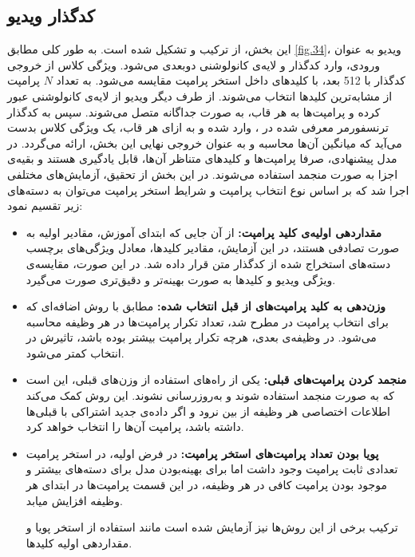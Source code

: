 \subsection{کدگذار ویدیو}
این بخش، از ترکیب  و  تشکیل شده است. به طور کلی مطابق \cref{fig.34}، ویدیو به عنوان ورودی، وارد کدگذار  و لایه‌ی کانولوشنی دو‌بعدی می‌شود. ویژگی کلاس  از خروجی کدگذار  با 512 بعد، با کلیدهای داخل استخر پرامپت مقایسه می‌شود. به تعداد $N$ پرامپت از مشابه‌ترین کلیدها انتخاب می‌شوند. از طرف دیگر ویدیو از لایه‌ی کانولوشنی عبور کرده و پرامپت‌ها به هر قاب، به صورت جداگانه متصل می‌شوند. سپس به کدگذار ترنسفورمر معرفی شده در ، وارد شده و به ازای هر قاب، یک ویژگی کلاس بدست می‌آید که میانگین آن‌ها محاسبه و به عنوان خروجی نهایی این بخش، ارائه می‌گردد. در مدل پیشنهادی، صرفا پرامپت‌ها و کلیدهای متناظر آن‌ها، قابل یادگیری هستند و بقیه‌ی اجزا به صورت منجمد استفاده می‌شوند. در این بخش از تحقیق، آزمایش‌های مختلفی اجرا شد که بر اساس نوع انتخاب پرامپت و شرایط استخر پرامپت می‌توان به دسته‌‌های زیر تقسیم نمود:
\begin{itemize}
\item \textbf{مقداردهی اولیه‌ی کلید پرامپت:}
از آن جایی که ابتدای آموزش، مقادیر اولیه به صورت تصادفی هستند، در این آزمایش، مقادیر کلیدها، معادل ویژگی‌های برچسب دسته‌های استخراج شده از کدگذار متن قرار داده شد. در این صورت، مقایسه‌ی ویژگی ویدیو و کلیدها به صورت بهینه‌تر و دقیق‌تری صورت می‌گیرد. 
\item \textbf{وزن‌دهی به کلید پرامپت‌های از قبل انتخاب شده:}
مطابق با روش اضافه‌ای که برای انتخاب پرامپت در  مطرح شد، تعداد تکرار پرامپت‌ها در هر وظیفه محاسبه می‌شود. در وظیفه‌ی بعدی، هرچه تکرار پرامپت بیشتر بوده باشد، تاثیرش در انتخاب کمتر می‌شود. 
\item \textbf{منجمد کردن پرامپت‌های قبلی:}
یکی از راه‌های استفاده از وزن‌های قبلی، این است که به صورت منجمد استفاده شوند و به‌روزرسانی نشوند. این روش کمک می‌کند اطلاعات اختصاصی هر وظیفه از بین نرود و اگر داده‌ی جدید اشتراکی با قبلی‌ها داشته باشد، پرامپت آن‌ها را انتخاب خواهد کرد.
\item \textbf{پویا بودن تعداد پرامپت‌های استخر پرامپت:}
در فرض اولیه، در استخر پرامپت تعدادی ثابت پرامپت وجود داشت اما برای بهینه‌بودن مدل برای دسته‌های بیشتر و موجود بودن پرامپت کافی در هر وظیفه، در این قسمت پرامپت‌ها در ابتدای هر وظیفه افزایش میابد. 

ترکیب برخی از این روش‌ها نیز آزمایش شده است مانند استفاده از استخر پویا و مقداردهی اولیه کلیدها.  
\end{itemize}
